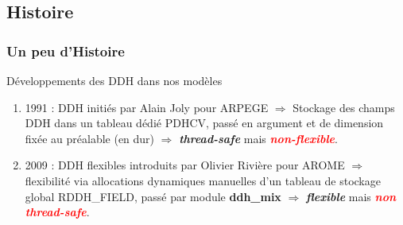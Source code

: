 \documentclass[aspectratio=169]{beamer}
\newcommand{\red}[1]{\textcolor{red}{#1}}
\newcommand{\green}[1]{\textcolor{mydarkgreen}{#1}}
\begin{document}
\subsection{Histoire}
\begin{frame}
\frametitle{\normalsize Un peu d'Histoire }
\vspace{-.3cm}
\begin{block}{\normalsize{Développements des DDH dans nos modèles}}
\begin{enumerate}
 \item 1991 : DDH initiés par Alain Joly pour ARPEGE $\Rightarrow$ 
 Stockage des champs DDH dans un tableau dédié PDHCV, 
 passé en argument et de dimension fixée au préalable (en dur)  
 $\Rightarrow$ \textbf{\textit{\green{thread-safe}}} mais \textbf{\textit{\red{non-flexible}}}.\\
 \item 2009 : DDH flexibles introduits par Olivier Rivière pour AROME  
 $\Rightarrow$ flexibilité via allocations dynamiques manuelles  
 d'un tableau de stockage global RDDH\_FIELD, passé par module \textbf{ddh\_mix} 
 $\Rightarrow$ \textbf{\textit{\green{flexible}}} mais \textbf{\textit{\red{non thread-safe}}}.\\
\end{enumerate}
\end{block}
\logos
\end{frame}
\end{document}
